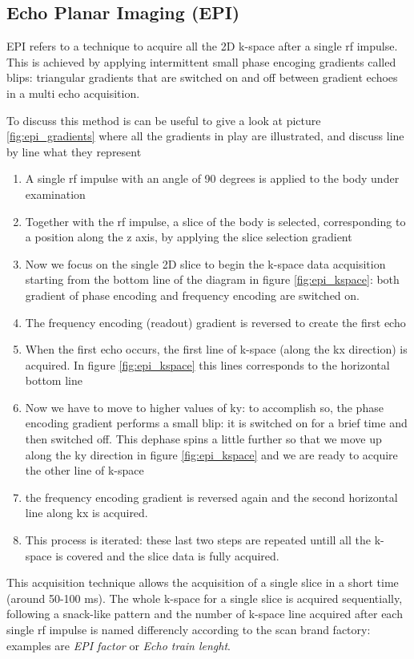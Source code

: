 \documentclass[10pt]{report}
\begin{document}
\subsection{Echo Planar Imaging (EPI)}\label{sec:epi}
EPI refers to a technique to acquire all the 2D k-space after a single rf impulse. This is achieved by applying intermittent small phase encoging gradients called blips: triangular gradients that are switched on and off between gradient echoes in a multi echo acquisition.

To discuss this method is can be useful to give a look at picture \ref{fig:epi_gradients} where all the gradients in play are illustrated, and discuss line by line what they represent
\begin{enumerate}
\item A single rf impulse with an angle of 90 degrees is applied to the body under examination
\item Together with the rf impulse, a slice of the body is selected, corresponding to a position along the z axis, by applying the slice selection gradient
\item Now we focus on the single 2D slice to begin the k-space data acquisition starting from the bottom line of the diagram in figure \ref{fig:epi_kspace}: both gradient of phase encoding and frequency encoding are switched on.
\item The frequency encoding (readout) gradient is reversed to create the first echo
\item When the first echo occurs, the first line of k-space (along the kx direction) is acquired. In figure \ref{fig:epi_kspace} this lines corresponds to the horizontal bottom line
\item Now we have to move to higher values of ky: to accomplish so, the phase encoding gradient performs a small blip: it is switched on for a brief time and then switched off. This dephase spins a little further so that we move up along the ky direction in figure \ref{fig:epi_kspace} and we are ready to acquire the other line of k-space
\item the frequency encoding gradient is reversed again and the second horizontal line along kx is acquired.
\item This process is iterated: these last two steps are repeated untill all the k-space is covered and the slice data is fully acquired.
\end{enumerate}

This acquisition technique allows the acquisition of a single slice in a short time (around 50-100 ms). The whole k-space for a single slice is acquired sequentially, following a snack-like pattern and the number of k-space line acquired after each single rf impulse is named differencly according to the scan brand factory: examples are \emph{EPI factor} or \emph{Echo train lenght}.
\end{document}
